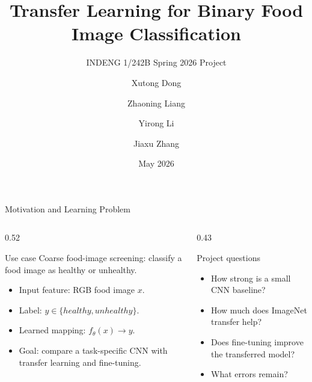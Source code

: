 \documentclass[10pt,xcolor={table,dvipsnames},t]{beamer}
\title[Food Image Classification]{Transfer Learning for Binary Food Image Classification}
\subtitle{INDENG 1/242B Spring 2026 Project}
\author{Xutong Dong \and Zhaoning Liang \and Yirong Li \and Jiaxu Zhang}
\institute{University of California, Berkeley}
\date{May 2026}
\newcommand{\healthy}{healthy}
\newcommand{\unhealthy}{unhealthy}
\begin{document}
\begin{frame}
  \titlepage
\end{frame}

\smallframetitle

\begin{frame}{Motivation and Learning Problem}
\footnotesize
\begin{columns}[T]
\begin{column}{0.52\textwidth}
\begin{block}{Use case}
Coarse food-image screening: classify a food image as \healthy{} or \unhealthy{}.
\end{block}
\begin{itemize}
  \item Input feature: RGB food image \(x\).
  \item Label: \(y\in\{\healthy,\unhealthy\}\).
  \item Learned mapping: \(f_\theta(x)\rightarrow y\).
  \item Goal: compare a task-specific CNN with transfer learning and fine-tuning.
\end{itemize}
\end{column}
\begin{column}{0.43\textwidth}
\begin{block}{Project questions}
\begin{itemize}
  \item How strong is a small CNN baseline?
  \item How much does ImageNet transfer help?
  \item Does fine-tuning improve the transferred model?
  \item What errors remain?
\end{itemize}
\end{block}
\end{column}
\end{columns}
\end{frame}
\end{document}
